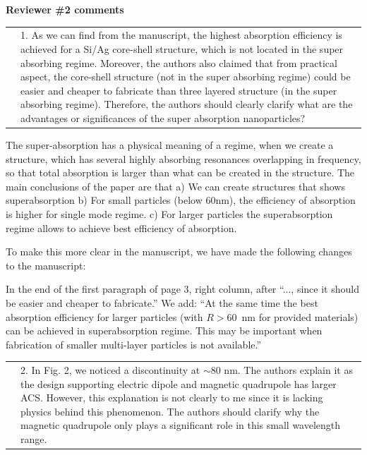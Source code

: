 \documentclass[a4paper]{article}
\begin{document}
\newpage
\begin{minipage}{1.0\linewidth}
  \textbf{Reviewer \#2 comments}\\
  \begin{tabular}[!H]{l|p{}}
    \quad & 1.  As we can find from the manuscript, the highest
    absorption efficiency is achieved for a Si/Ag core-shell
    structure, which is not located in the super absorbing
    regime. Moreover, the authors also claimed that from practical
    aspect, the core-shell structure (not in the super absorbing
    regime) could be easier and cheaper to fabricate than three
    layered structure (in the super absorbing regime). Therefore, the
    authors should clearly clarify what are the advantages or
    significances of the super absorption nanoparticles?
\end{tabular}
\end{minipage}

The super-absorption has a physical meaning of a regime, when we
create a structure, which has several highly absorbing resonances
overlapping in frequency, so that total absorption is larger than what
can be created in the structure. The main conclusions of the paper are
that a) We can create structures that shows superabsorption b) For
small particles (below 60nm), the efficiency of absorption is higher
for single mode regime.  c) For larger particles the superabsorption
regime allows to achieve best efficiency of absorption.

To make this more clear in the manuscript, we have made the following changes to the manuscript: 

In the end of the first paragraph of page 3, right column, after
``..., since it should be easier and cheaper to fabricate.'' We add:
``At the same time the best absorption efficiency for larger particles
(with $R>60$~nm for provided materials) can be achieved in
superabsorption regime. This may be important when fabrication of
smaller multi-layer particles is not available.''


\begin{tabular}[!H]{l|p{}}
  \quad & 2.  In Fig. 2, we noticed a discontinuity at $\sim$80
  nm. The authors explain it as the design supporting electric dipole
  and magnetic quadrupole has larger ACS. However, this explanation is
  not clearly to me since it is lacking physics behind this
  phenomenon. The authors should clarify why the magnetic quadrupole
  only plays a significant role in this small wavelength range.
\end{tabular}
\end{document}
